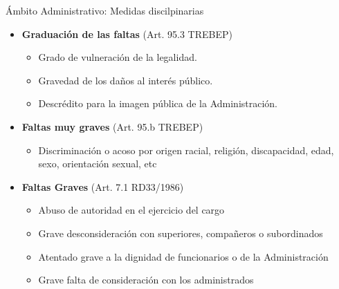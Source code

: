 \documentclass{beamer}
\begin{document}
    \begin{frame}{Ámbito Administrativo: Medidas discilpinarias}
        \begin{itemize}
            \item \textbf{Graduación de las faltas} (Art. 95.3 TREBEP)
            \begin{itemize}
                \item Grado de vulneración de la legalidad.
                \item Gravedad de los daños al interés público.
                \item Descrédito para la imagen pública de la Administración.
            \end{itemize}
            \item \textbf{Faltas muy graves} (Art. 95.b TREBEP)
            \begin{itemize}
                \item Discriminación o acoso por origen racial, religión, discapacidad, edad, sexo, orientación sexual, etc
            \end{itemize}
            \item \textbf{Faltas Graves} (Art. 7.1 RD33/1986)
            \begin{itemize}
                \item Abuso de autoridad en el ejercicio del cargo
                \item Grave desconsideración con superiores, compañeros o subordinados
                \item Atentado grave a la dignidad de funcionarios o de la Administración
                \item Grave falta de consideración con los administrados
            \end{itemize}
        \end{itemize}
    \end{frame}
\end{document}
